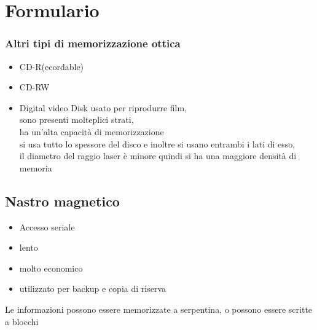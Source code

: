 \documentclass[arch.tex]{subfiles}
\begin{document}
\section{Formulario}



\subsubsection{Altri tipi di memorizzazione ottica}%
\label{subsub:altri_tipi_di_memorizzazione_ottica}

\begin{itemize}
	\item CD-R(ecordable)
	\item CD-RW
	\item Digital video Disk
		usato per riprodurre film, \\
		sono presenti molteplici strati,\\
		ha un'alta capacità di memorizzazione\\
		si usa tutto lo spessore del disco e inoltre si usano entrambi i
		lati di esso,\\
		il diametro del raggio laser è minore quindi si ha una maggiore 
		densità di memoria 

\end{itemize}

\subsection{Nastro magnetico}%
\label{sub:nastro_magnetico}

\begin{itemize}
	\item Accesso seriale
	\item lento
	\item molto economico 
	\item utilizzato per backup e copia di riserva
\end{itemize}
Le informazioni possono essere memorizzate a serpentina, o possono essere scritte 
a blocchi
\end{document}
